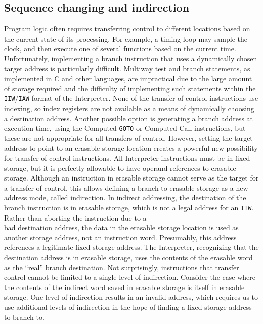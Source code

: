 \documentclass[refcap, oxford]{ahsan}
\begin{document}
\subsection{Sequence changing and indirection}
Program logic often requires transferring control to different locations based on the current state of its processing. For example, a timing loop may sample the clock, and then execute one of several functions based on the current time. Unfortunately, implementing a branch instruction that uses a dynamically chosen target address is particularly difficult. Multiway test and branch statements, as implemented in C and other languages, are impractical due to the large amount of storage required and the difficulty of implementing such statements within the \texttt{IIW}/\texttt{IAW} format of the Interpreter. None of the transfer of control instructions use indexing, so index registers are not available as a means of dynamically choosing a destination address. Another possible option is generating a branch address at execution time, using the Computed \texttt{GOTO} or Computed Call instructions, but these are not appropriate for all transfers of control. However, setting the target address to point to an erasable storage location creates a powerful new possibility for transfer-of-control instructions. All Interpreter instructions must be in fixed storage, but it is perfectly allowable to have operand references to erasable storage. Although an instruction in erasable storage cannot serve as the target for a transfer of control, this allows defining a branch to erasable storage as a new address mode, called indirection. In indirect addressing, the destination of the branch instruction is in erasable storage, which is not a legal address for an \texttt{IIW}. Rather than aborting the instruction due to a\\
bad destination address, the data in the erasable storage location is used as another storage address, not an instruction word. Presumably, this address references a legitimate fixed storage address. The Interpreter, recognizing that the destination address is in erasable storage, uses the contents of the erasable word as the ``real'' branch destination. Not surprisingly, instructions that transfer control cannot be limited to a single level of indirection. Consider the case where the contents of the indirect word saved in erasable storage is itself in erasable storage. One level of indirection results in an invalid address, which requires us to use additional levels of indirection in the hope of finding a fixed storage address to branch to.
\end{document}
